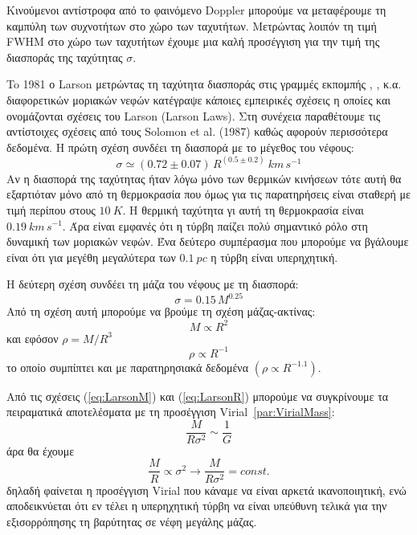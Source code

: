 \documentclass[a4paper,12pt]{memoir}
\begin{document}
Κινούμενοι αντίστροφα από το φαινόμενο Doppler μπορούμε να μεταφέρουμε τη καμπύλη των συχνοτήτων στο χώρο των ταχυτήτων. Μετρώντας λοιπόν τη τιμή FWHM στο χώρο των ταχυτήτων έχουμε μια καλή προσέγγιση για την τιμή της διασποράς της ταχύτητας $\sigma$.

To 1981 ο Larson \cite{larson_1981} μετρώντας τη ταχύτητα διασποράς στις γραμμές εκπομπής , ,  κ.α. διαφορετικών μοριακών νεφών κατέγραψε κάποιες εμπειρικές σχέσεις η οποίες και ονομάζονται σχέσεις του Larson (Larson Laws). Στη συνέχεια παραθέτουμε τις αντίστοιχες σχέσεις από τους Solomon et al. (1987) \cite{solomon_1987} καθώς αφορούν περισσότερα δεδομένα.
Η πρώτη σχέση συνδέει τη διασπορά με το μέγεθος του νέφους:
\begin{equation}
\label{eq:LarsonR}
\sigma \simeq (0.72 \pm 0.07)\, R^{(0.5 \pm 0.2)} \ km\, s^{-1}
\end{equation} 
Αν η διασπορά της ταχύτητας ήταν λόγω μόνο των θερμικών κινήσεων τότε αυτή θα εξαρτιόταν μόνο από τη θερμοκρασία που όμως για τις παρατηρήσεις είναι σταθερή με τιμή περίπου στους $10 \ K$. Η θερμική ταχύτητα γι αυτή τη θερμοκρασία είναι $0.19\ km\, s^{-1}$.
Άρα είναι εμφανές ότι η τύρβη παίζει πολύ σημαντικό ρόλο στη δυναμική των μοριακών νεφών. Ένα δεύτερο συμπέρασμα που μπορούμε να βγάλουμε είναι ότι για μεγέθη μεγαλύτερα των $0.1 \ pc$ η τύρβη είναι υπερηχητική.

Η δεύτερη σχέση συνδέει τη μάζα του νέφους με τη διασπορά:
\begin{equation}
\label{eq:LarsonM}
\sigma = 0.15\, M^{0.25}
\end{equation}
Από τη σχέση αυτή μπορούμε να βρούμε τη σχέση μάζας-ακτίνας:
\begin{equation}
M\propto R^2
\end{equation}
και εφόσον $\rho = M/R^3$
\begin{equation}
\label{eq:Larsonrho}
\rho \propto R^{-1}
\end{equation}
το οποίο συμπίπτει και με παρατηρησιακά δεδομένα $(\rho \propto R^{-1.1})$.
\medskip

Από τις σχέσεις (\ref{eq:LarsonM}) και (\ref{eq:LarsonR}) μπορούμε να συγκρίνουμε τα πειραματικά αποτελέσματα με τη προσέγγιση Virial~\ref{par:VirialMass}: 
$$
\frac{M}{R \sigma ^2}\sim \frac{1}{G}
$$
άρα θα έχουμε
\begin{equation}
\frac{M}{R}\propto \sigma ^2 \rightarrow \frac{M}{R \sigma ^2}=const.
\end{equation}
δηλαδή φαίνεται η προσέγγιση Virial που κάναμε να είναι αρκετά ικανοποιητική, ενώ αποδεικνύεται ότι εν τέλει η υπερηχητική τύρβη να είναι υπεύθυνη τελικά για την εξισορρόπησης τη βαρύτητας σε νέφη μεγάλης μάζας. 
\end{document}
